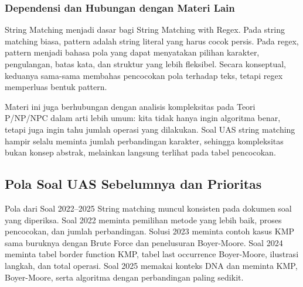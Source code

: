 \subsubsection{Dependensi dan Hubungan dengan Materi Lain}

String Matching menjadi dasar bagi String Matching with Regex. Pada string matching biasa, pattern adalah string literal yang harus cocok persis. Pada regex, pattern menjadi bahasa pola yang dapat menyatakan pilihan karakter, pengulangan, batas kata, dan struktur yang lebih fleksibel. Secara konseptual, keduanya sama-sama membahas pencocokan pola terhadap teks, tetapi regex memperluas bentuk pattern.

Materi ini juga berhubungan dengan analisis kompleksitas pada Teori P/NP/NPC dalam arti lebih umum: kita tidak hanya ingin algoritma benar, tetapi juga ingin tahu jumlah operasi yang dilakukan. Soal UAS string matching hampir selalu meminta jumlah perbandingan karakter, sehingga kompleksitas bukan konsep abstrak, melainkan langsung terlihat pada tabel pencocokan.

\subsection{Pola Soal UAS Sebelumnya dan Prioritas}

\begin{cmt}{Pola dari Soal 2022--2025}{}
String matching muncul konsisten pada dokumen soal yang diperiksa. Soal 2022 meminta pemilihan metode yang lebih baik, proses pencocokan, dan jumlah perbandingan. Solusi 2023 meminta contoh kasus KMP sama buruknya dengan Brute Force dan penelusuran Boyer-Moore. Soal 2024 meminta tabel border function KMP, tabel last occurrence Boyer-Moore, ilustrasi langkah, dan total operasi. Soal 2025 memakai konteks DNA dan meminta KMP, Boyer-Moore, serta algoritma dengan perbandingan paling sedikit.
\end{cmt}

